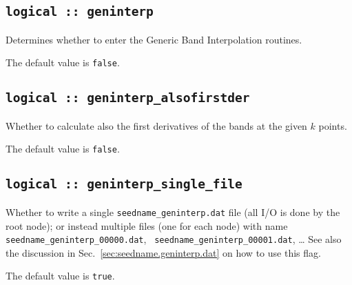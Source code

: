 \subsection[boltzwann]{\tt logical :: geninterp}
Determines whether to enter the Generic Band Interpolation routines.

The default value is \verb#false#.

\subsection[geninterp\_alsofirstder]{\tt logical :: geninterp\_alsofirstder}
Whether to calculate also the first derivatives of the bands at the
given $k$ points.

The default value is \verb#false#.

\subsection[geninterp\_alsofirstder]{\tt logical :: geninterp\_single\_file}
Whether to write a single  {\tt seedname\_geninterp.dat} file (all I/O is done by the root node); or
instead multiple files (one for each node) with
name {\tt seedname\_geninterp\_00000.dat}, {\tt
  seedname\_geninterp\_00001.dat}, \ldots
See also the discussion in Sec.~\ref{sec:seedname.geninterp.dat} on
how to use this flag.

The default value is \verb#true#.
